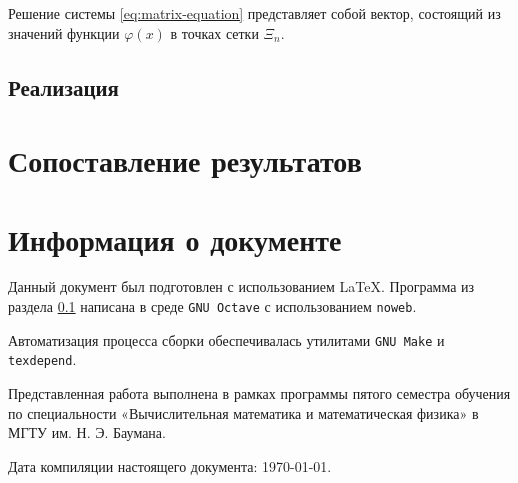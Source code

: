 \documentclass{article}
\numberwithin{equation}{section}
\renewcommand{\phi}{\varphi}
\providecommand{\program}[1]{{\tt #1}}
\begin{document}
Решение системы \eqref{eq:matrix-equation} представляет собой вектор,
состоящий из значений функции $\phi(x)$ в точках сетки $\Xi_n$.

\subsection{Реализация}
\label{sec:numeric-implementation}




\section{Сопоставление результатов}
\label{sec:comparison}


\clearpage
\appendix
\section{Информация о документе}

Данный документ был подготовлен с использованием \LaTeX{}. Программа
из раздела \ref{sec:numeric-implementation} написана в среде
\program{GNU Octave} с использованием \program{noweb}.

Автоматизация процесса сборки обеспечивалась утилитами
\program{GNU Make} и \program{texdepend}.

Представленная работа выполнена в рамках программы пятого семестра
обучения по специальности «Вычислительная математика и математическая
физика» в МГТУ им. Н. Э. Баумана.

Дата компиляции настоящего документа: \today.



\end{document}
